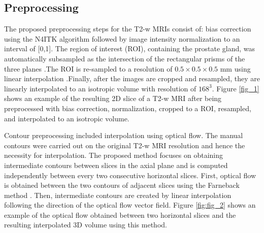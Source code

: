 \subsection{Preprocessing}
\label{subsec:prepro}
The proposed preprocessing steps for the T2-w MRIs consist of: bias correction using the N4ITK algorithm \cite{n4itk} followed by image intensity normalization to an interval of [0,1]. The region of interest (ROI), containing the prostate gland, was automatically subsampled as the intersection of the rectangular prisms of the three planes \cite{anneke}.The ROI is re-sampled to a resolution of $0.5 \times 0.5 \times 0.5$ mm  using linear interpolation \cite{itk}.Finally, after the images are cropped and resampled, they are linearly interpolated to an isotropic volume with resolution of $168^3$. Figure \ref{fig_1} shows an example of the resulting 2D slice of a T2-w MRI after being preprocessed with bias correction, normalization, cropped to a ROI, resampled, and interpolated to an isotropic volume. 




Contour preprocessing included interpolation using optical flow.  The manual contours were carried out on the original T2-w MRI resolution and hence the necessity for interpolation. The proposed method focuses on obtaining intermediate contours between slices in the axial plane and is computed independently between every two consecutive horizontal slices. First, optical flow is obtained between the two contours of adjacent slices using the Farneback method \cite{optflow}. Then, intermediate contours are created by linear interpolation following the direction of the optical flow vector field. Figure \ref{fig:fig_2} shows an example of the optical flow obtained between two horizontal slices and the resulting interpolated 3D volume using this method. 


